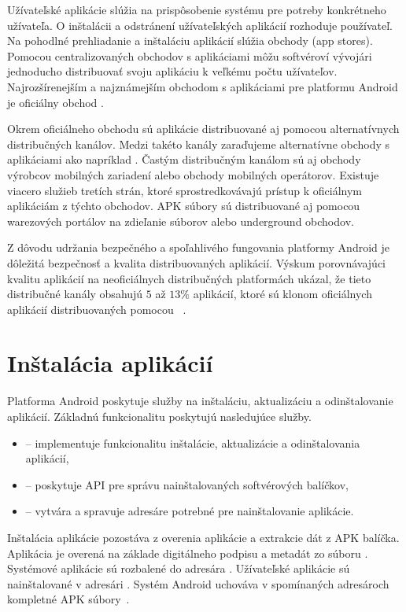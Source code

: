 Užívateľské aplikácie slúžia na prispôsobenie systému pre potreby konkrétneho užívateľa. O inštalácii a odstránení užívateľských aplikácií rozhoduje používateľ. Na pohodlné prehliadanie a inštaláciu aplikácií slúžia obchody (app stores). Pomocou centralizovaných obchodov s aplikáciami môžu softvéroví vývojári jednoducho distribuovať svoju aplikáciu k veľkému počtu užívateľov.  Najrozšírenejším a najznámejším obchodom s aplikáciami pre platformu Android je oficiálny obchod . 

Okrem oficiálneho obchodu sú aplikácie distribuované aj pomocou alternatívnych distribučných kanálov. Medzi takéto kanály zaraďujeme alternatívne obchody s aplikáciami ako napríklad . Častým distribučným kanálom sú aj obchody výrobcov mobilných zariadení alebo obchody mobilných operátorov. Existuje viacero služieb tretích strán, ktoré sprostredkovávajú prístup k oficiálnym aplikáciám z týchto obchodov. APK súbory sú distribuované aj pomocou warezových portálov na zdieľanie súborov alebo underground obchodov. 

Z dôvodu udržania bezpečného a spoľahlivého fungovania platformy Android je dôležitá bezpečnosť a kvalita distribuovaných aplikácií. Výskum porovnávajúci kvalitu aplikácií na neoficiálnych distribučných platformách ukázal, že tieto distribučné kanály obsahujú $5$ až $13\%$ aplikácií, ktoré sú klonom oficiálnych aplikácií distribuovaných pomocou ~\cite{Zhou2012}.

\section{Inštalácia aplikácií}

Platforma Android poskytuje služby na inštaláciu, aktualizáciu a odinštalovanie aplikácií. \newline
Základnú funkcionalitu poskytujú nasledujúce služby.
\begin{itemize}
	\item {} -- implementuje funkcionalitu inštalácie, aktualizácie a odinštalovania aplikácií,
	\item {} -- poskytuje API pre správu nainštalovaných softvérových balíčkov,
	\item {} -- vytvára a spravuje adresáre potrebné pre nainštalovanie aplikácie.
\end{itemize}
Inštalácia aplikácie pozostáva z overenia aplikácie a extrakcie dát z APK balíčka. Aplikácia je overená na základe digitálneho podpisu a metadát zo súboru . Systémové aplikácie sú rozbalené do adresára . Užívateľské aplikácie sú nainštalované v adresári . Systém Android uchováva v spomínaných adresároch kompletné APK súbory~\cite{AndroidDeveloper}.

